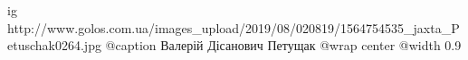 
 
 
 
 

\ifcmt
  ig http://www.golos.com.ua/images_upload/2019/08/020819/1564754535_jaxta_Petuschak0264.jpg
	@caption Валерій Дісанович Петущак 
  @wrap center
  @width 0.9
\fi
